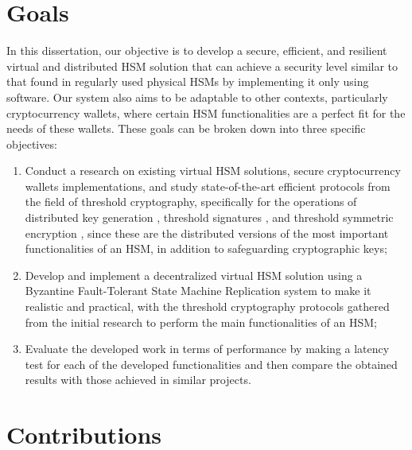 \section{Goals}

In this dissertation, our objective is to develop a secure, efficient, and resilient virtual and distributed HSM solution that can achieve a security level similar to that found in regularly used physical HSMs by implementing it only using software. Our system also aims to be adaptable to other contexts, particularly cryptocurrency wallets, where certain HSM functionalities are a perfect fit for the needs of these wallets. These goals can be broken down into three specific objectives:
\begin{enumerate}
    \item Conduct a research on existing virtual HSM solutions, secure cryptocurrency wallets implementations, and study state-of-the-art efficient protocols from the field of threshold cryptography, specifically for the operations of distributed key generation \cite{dkgwild,cobra}, threshold signatures \cite{gennaro18,frost3,blsdraft}, and threshold symmetric encryption \cite{dise}, since these are the distributed versions of the most important functionalities of an HSM, in addition to safeguarding cryptographic keys;
    \item Develop and implement a decentralized virtual HSM solution using a Byzantine Fault-Tolerant State Machine Replication system to make it realistic and practical, with the threshold cryptography protocols gathered from the initial research to perform the main functionalities of an HSM;
    \item Evaluate the developed work in terms of performance by making a latency test for each of the developed functionalities and then compare the obtained results with those achieved in similar projects.
\end{enumerate}


\section{Contributions}

